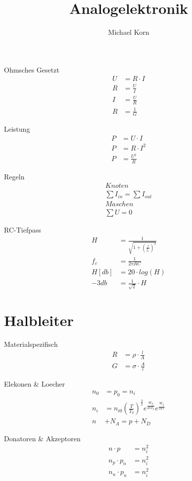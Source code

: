 \documentclass{article}
\title{Analogelektronik}
\author{Michael Korn}
\begin{document}
\maketitle
\begin{multicols}{4}
    Ohmsches Gesetzt
    \begin{align*}
        U &= R \cdot I \\
        R &= \frac{U}{I} \\
        I &= \frac{U}{R} \\
        R &= \frac{1}{G} 
    \end{align*}
    
    Leistung
    \begin{align*}
        P &= U \cdot I \\
        P &= R \cdot I^2 \\
        P &= \frac{U^2}{R}
    \end{align*}
    
    Regeln
    \begin{align*}
        Knoten \\
        \sum I_{in} = \sum I_{out} \\
        Maschen \\
        \sum U = 0
    \end{align*}

    RC-Tiefpass
    \begin{align*}
        H &= \frac{1}{\sqrt{1+(\frac{f}{f_c})^2}} \\
        f_c &= \frac{1}{2\pi RC} \\
        H[db] &= 20\cdot log(H) \\
        -3db &= \frac{1}{\sqrt{2}}\cdot H
    \end{align*}
    
\end{multicols} 

\section*{Halbleiter}
\begin{multicols}{3}
    Materialspezifisch
    \begin{align*}
        R &= \rho \cdot \frac{l}{A} \\
        G &= \sigma \cdot \frac{A}{l}
    \end{align*}

    Elekonen \& Loecher
    \begin{align*}
        n_0 &= p_0 = n_i \\
        n_i &= n_{i0}(\frac{T}{T_0})^{\frac32}e^{\frac{W_g}{2kT_0}}e^{\frac{W_g}{2kT}} \\
        n&+N_A = p+N_D
    \end{align*}

    Donatoren \& Akzeptoren
    \begin{align*}
        n\cdot p &= n_i^2 \\
        n_p\cdot p_n &= n_i^2 \\
        n_n\cdot p_n &= n_i^2 
    \end{align*}

\end{multicols} 
\end{document}
